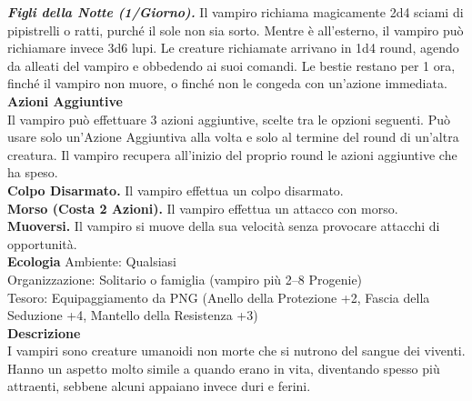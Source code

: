 \begin{multicols}{2}
\emph{\textbf{Figli della Notte (1/Giorno).}} Il vampiro richiama magicamente 2d4 sciami di pipistrelli o ratti, purché il sole non sia sorto. Mentre è all'esterno, il vampiro può richiamare invece 3d6 lupi. Le creature richiamate arrivano in 1d4 round, agendo da alleati del vampiro e obbedendo ai suoi comandi. Le bestie restano per 1 ora, finché il vampiro non muore, o finché non le congeda con un'azione immediata.  \\
\textbf{Azioni Aggiuntive}\\
Il vampiro può effettuare 3 azioni aggiuntive, scelte tra le opzioni seguenti. Può usare solo un'Azione Aggiuntiva alla volta e solo al termine del round di un'altra creatura. Il vampiro recupera all'inizio del proprio round le azioni aggiuntive che ha speso.\\
\textbf{Colpo Disarmato.} Il vampiro effettua un colpo disarmato. \\
\textbf{Morso (Costa 2 Azioni).} Il vampiro effettua un attacco con morso.\\
\textbf{Muoversi.} Il vampiro si muove della sua velocità senza provocare attacchi di opportunità.\\
\textbf{Ecologia}
Ambiente: Qualsiasi\\
Organizzazione: Solitario o famiglia (vampiro più 2–8 Progenie)\\
Tesoro: Equipaggiamento da PNG (Anello della Protezione +2, Fascia della Seduzione +4, Mantello della Resistenza +3)\\
\textbf{Descrizione}\\
I vampiri sono creature umanoidi non morte che si nutrono del sangue dei viventi. Hanno un aspetto molto simile a quando erano in vita, diventando spesso più attraenti, sebbene alcuni appaiano invece duri e ferini.\\


\end{multicols}

